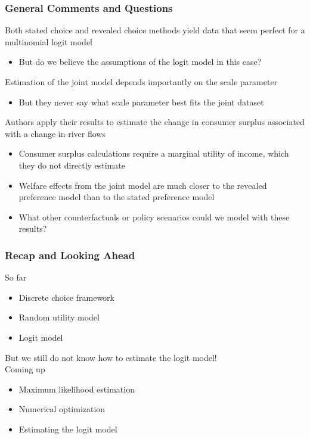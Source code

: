 \documentclass{beamer}\usepackage[]{graphicx}\usepackage[]{color}
\begin{document}
\begin{frame}\frametitle{General Comments and Questions}
    Both stated choice and revealed choice methods yield data that seem perfect for a multinomial logit model
    \begin{itemize}
    	\item But do we believe the assumptions of the logit model in this case?
    \end{itemize}
    \vspace{2ex}
    Estimation of the joint model depends importantly on the scale parameter
    \begin{itemize}
    	\item But they never say what scale parameter best fits the joint dataset
    \end{itemize}
    \vspace{2ex}
    Authors apply their results to estimate the change in consumer surplus associated with a change in river flows
    \begin{itemize}
    	\item Consumer surplus calculations require a marginal utility of income, which they do not directly estimate
    	\item Welfare effects from the joint model are much closer to the revealed preference model than to the stated preference model
    	\item What other counterfactuals or policy scenarios could we model with these results?
    \end{itemize}
\end{frame}

\begin{frame}\frametitle{Recap and Looking Ahead}
    So far
    \begin{itemize}
    	\item Discrete choice framework
    	\item Random utility model
    	\item Logit model
    \end{itemize}
    \vspace{3ex}
    But we still do not know how to estimate the logit model! \\
    \vspace{3ex}
    Coming up
    \begin{itemize}
    	\item Maximum likelihood estimation
    	\item Numerical optimization
    	\item Estimating the logit model
    \end{itemize}
\end{frame}
\end{document}

